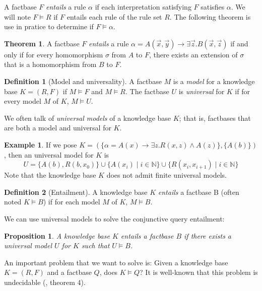 \documentclass{article}
\newtheorem{proposition}{Proposition}[section]
\theoremstyle{definition}
\newtheorem{definition}{Definition}[section]
\newtheorem{theorem}{Theorem}[section]
\newtheorem{example}{Example}[section]
\theoremstyle{remark}
\def \N {\mathbb N}
\begin{document}
A factbase $F$ \emph{entails} a rule $\alpha$ if each interpretation satisfying $F$ satisfies $\alpha$. We will note $F \models R$ if $F$ entails each rule of the rule set $R$. The following theorem is use in pratice to determine if $F \models \alpha$.

\begin{theorem}
A factbase $F$ \emph{entails} a rule $\alpha = A(\vec x,\vec y) \rightarrow \exists \vec z. B(\vec x,\vec z)$ if and only if for every homomorphism $\sigma$ from $A$ to $F$, there exists an extension of $\sigma$ that is a homomorphism from $B$ to $F$.
\end{theorem}

\begin{definition}[Model and universality]
A factbase $M$ is a \emph{model} for a knowledge base $K = (R,F)$ if $M \models F$ and $M \models R$. The factbase $U$ is \emph{universal} for $K$ if for every model $M$ of $K$, $M \models U$.
\end{definition}

We often talk of \emph{universal models} of a knowledge base $K$; that is, factbases that are both a model and universal for $K$. 

\begin{example}
	If we pose $K = (\{\alpha = A(x) \rightarrow \exists z.R(x,z) \wedge A(z)\},\{A(b)\})$, then an universal model for $K$ is $$U = \{A(b),R(b,x_0)\}\cup \{A(x_i)\mid i \in \N\}\cup \{R(x_i,x_{i+1}) \mid i \in \N\}$$ Note that the knowledge base $K$ does not admit finite universal models.
\end{example}

\begin{definition}[Entailment]
A knowledge base $K$ \emph{entails} a factbase B (often noted $K \models B$) if for each model $M$ of $K$, $M \models B$.
\end{definition}

We can use universal models to solve the conjunctive query entailment:

\begin{proposition}
A knowledge base $K$ entails a factbase $B$ if there exists a universal model $U$ for $K$ such that $U \models B$.
\end{proposition}

An important problem that we want to solve is: Given a knowledge base $K=(R,F)$ and a factbase $Q$,  does $K \models Q$? It  is  well-known  that  this  problem  is  undecidable (\cite{NP2}, theorem 4). 
\end{document}
